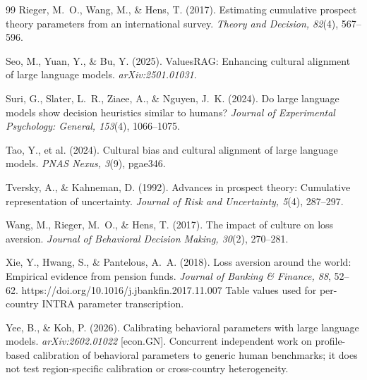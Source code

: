 \documentclass[10pt,letterpaper]{article}
\begin{document}
\begin{thebibliography}{99}
Rieger, M.~O., Wang, M., \& Hens, T. (2017). Estimating cumulative prospect
theory parameters from an international survey. \textit{Theory and Decision,
82}(4), 567--596.

Seo, M., Yuan, Y., \& Bu, Y. (2025). ValuesRAG: Enhancing cultural alignment
of large language models. \textit{arXiv:2501.01031}.

Suri, G., Slater, L.~R., Ziaee, A., \& Nguyen, J.~K. (2024). Do large
language models show decision heuristics similar to humans? \textit{Journal of
Experimental Psychology: General, 153}(4), 1066--1075.

Tao, Y., et al. (2024). Cultural bias and cultural alignment of large language
models. \textit{PNAS Nexus, 3}(9), pgae346.

Tversky, A., \& Kahneman, D. (1992). Advances in prospect theory: Cumulative
representation of uncertainty. \textit{Journal of Risk and Uncertainty, 5}(4),
287--297.

Wang, M., Rieger, M.~O., \& Hens, T. (2017). The impact of culture on loss
aversion. \textit{Journal of Behavioral Decision Making, 30}(2), 270--281.

Xie, Y., Hwang, S., \& Pantelous, A.~A. (2018). Loss aversion around the
world: Empirical evidence from pension funds. \textit{Journal of Banking \&
Finance, 88}, 52--62. https://doi.org/10.1016/j.jbankfin.2017.11.007
Table values used for per-country INTRA parameter transcription.

Yee, B., \& Koh, P. (2026). Calibrating behavioral parameters with large
language models. \textit{arXiv:2602.01022} [econ.GN]. Concurrent independent
work on profile-based calibration of behavioral parameters to generic human
benchmarks; it does not test region-specific calibration or cross-country
heterogeneity.

\end{thebibliography}
\end{document}
